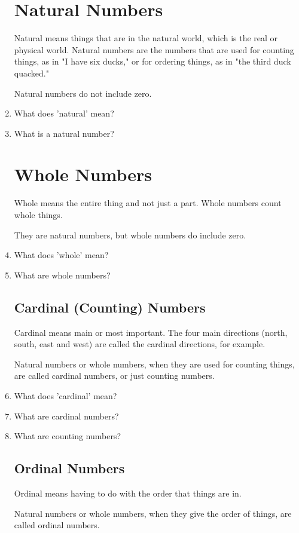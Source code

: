 \documentclass{article}
\begin{document}
\begin{enumerate}
\section*{Natural Numbers}
Natural means things that are in the natural world, which is the real or physical world. Natural numbers are the numbers that are used for counting things, as in "I have six ducks," or for ordering things, as in "the third duck quacked."

Natural numbers do not include zero.

\item What does 'natural' mean?
\item What is a natural number?

\section*{Whole Numbers}
Whole means the entire thing and not just a part. Whole numbers count whole things.

They are natural numbers, but whole numbers do include zero.

\item What does 'whole' mean?
\item What are whole numbers?

\newpage

\subsection*{Cardinal (Counting) Numbers}
Cardinal means main or most important. The four main directions (north, south, east and west) are called the cardinal directions, for example. 

Natural numbers or whole numbers, when they are used for counting things, are called cardinal numbers, or just counting numbers.

\item What does 'cardinal' mean?
\item What are cardinal numbers?
\item What are counting numbers?

\subsection*{Ordinal Numbers}
Ordinal means having to do with the order that things are in.

Natural numbers or whole numbers, when they give the order of things, are called ordinal numbers.


\end{enumerate}
\end{document}
